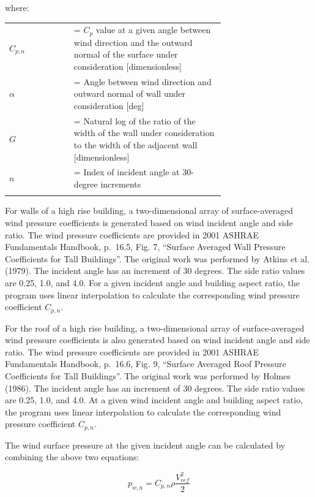 where:

\begin{tabular}{lp{0.7\linewidth}}
\\
$C_{p,n}$ &= $C_p$ value at a given angle between wind direction and the outward normal of the surface under consideration [dimensionless]\\
$\alpha$ &= Angle between wind direction and outward normal of wall under consideration [deg]\\
$G$ &= Natural log of the ratio of the width of the wall under consideration to the width of the adjacent wall [dimensionless]\\
$n$ &= Index of incident angle at 30-degree increments\\
\\
\end{tabular}

For walls of a high rise building, a two-dimensional array of surface-averaged wind pressure coefficients is generated based on wind incident angle and side ratio. The wind pressure coefficients are provided in 2001 ASHRAE Fundamentals Handbook, p.~16.5, Fig. 7, ``Surface Averaged Wall Pressure Coefficients for Tall Buildings''. The original work was performed by Atkins et al. (1979). The incident angle has an increment of 30 degrees. The side ratio values are 0.25, 1.0, and 4.0. For a given incident angle and building aspect ratio, the program uses linear interpolation to calculate the corresponding wind pressure coefficient $C_{p,n}$.

For the roof of a high rise building, a two-dimensional array of surface-averaged wind pressure coefficients is also generated based on wind incident angle and side ratio. The wind pressure coefficients are provided in 2001 ASHRAE Fundamentals Handbook, p.~16.6, Fig. 9, ``Surface Averaged Roof Pressure Coefficients for Tall Buildings''. The original work was performed by Holmes (1986). The incident angle has an increment of 30 degrees. The side ratio values are 0.25, 1.0, and 4.0. At a given wind incident angle and building aspect ratio, the program uses linear interpolation to calculate the corresponding wind pressure coefficient $C_{p,n}$.

The wind surface pressure at the given incident angle can be calculated by combining the above two equations:

\begin{equation}
p_{w,n} = C_{p,n}\rho \frac{V_{ref}^2}{2}
\end{equation}

